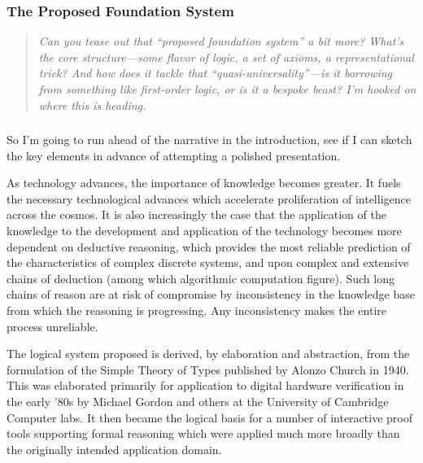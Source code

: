 \subsubsection{The Proposed Foundation System}

\begin{quote}
  {\it  Can you tease out that “proposed foundation system” a bit more? What’s the core structure—some flavor of logic, a set of axioms, a representational trick? And how does it tackle that “quasi-universality”—is it borrowing from something like first-order logic, or is it a bespoke beast? I’m hooked on where this is heading.}
  \end{quote}


\subsubsection{}
So I'm going to run ahead of the narrative in the introduction, see if I can sketch the key elements in advance of attempting a polished presentation.

As technology advances, the importance of knowledge becomes greater.
It fuels the necessary technological advances which accelerate proliferation of intelligence across the cosmos.
It is also increasingly the case that the application of the knowledge to the development and application of the technology becomes more dependent on deductive reasoning, which provides the most reliable prediction of the characteristics of complex discrete systems, and upon complex and extensive chains of deduction (among which algorithmic computation figure).
Such long chains of reason are at risk of compromise by inconsistency in the knowledge base from which the reasoning is progressing.
Any inconsistency makes the entire process unreliable.

The logical system proposed is derived, by elaboration and abstraction, from the formulation of the Simple Theory of Types published by Alonzo Church in 1940.
This was elaborated primarily for application to digital hardware verification in the early '80s by Michael Gordon and others at the University of Cambridge Computer labs.
It then became the logical basis for a number of interactive proof tools supporting formal reasoning which were applied much more broadly than the originally intended application domain.

